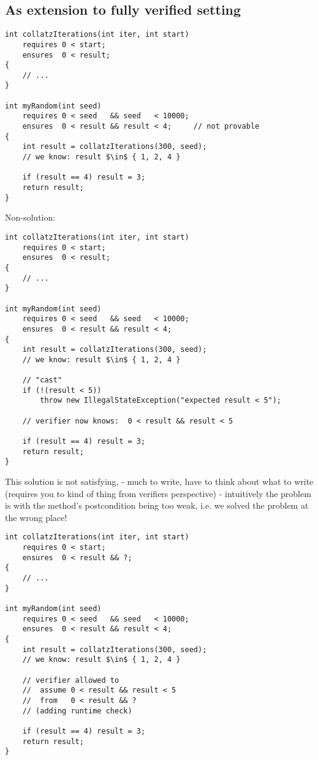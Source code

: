 \subsection{As extension to fully verified setting}
\begin{lstlisting}
int collatzIterations(int iter, int start)
    requires 0 < start;
    ensures  0 < result;
{
    // ...
}

int myRandom(int seed)
    requires 0 < seed   && seed   < 10000;
    ensures  0 < result && result < 4;     // not provable
{
    int result = collatzIterations(300, seed);
    // we know: result $\in$ { 1, 2, 4 }
    
    if (result == 4) result = 3;
    return result;
}
\end{lstlisting}

Non-solution:
\begin{lstlisting}
int collatzIterations(int iter, int start)
    requires 0 < start;
    ensures  0 < result;
{
    // ...
}

int myRandom(int seed)
    requires 0 < seed   && seed   < 10000;
    ensures  0 < result && result < 4;
{
    int result = collatzIterations(300, seed);
    // we know: result $\in$ { 1, 2, 4 }
    
    // "cast"
    if (!(result < 5))
        throw new IllegalStateException("expected result < 5");

    // verifier now knows:  0 < result && result < 5 
    
    if (result == 4) result = 3;
    return result;
}
\end{lstlisting}
This solution is not satisfying, 
- much to write, have to think about what to write (requires you to kind of thing from verifiers perspective)
- intuitively the problem is with the method's postcondition being too weak, i.e. we solved the problem at the wrong place!


\begin{lstlisting}
int collatzIterations(int iter, int start)
    requires 0 < start;
    ensures  0 < result && ?;
{
    // ...
}

int myRandom(int seed)
    requires 0 < seed   && seed   < 10000;
    ensures  0 < result && result < 4;
{
    int result = collatzIterations(300, seed);
    // we know: result $\in$ { 1, 2, 4 }
    
    // verifier allowed to
    //  assume 0 < result && result < 5
    //  from   0 < result && ?
    // (adding runtime check)
    
    if (result == 4) result = 3;
    return result;
}
\end{lstlisting}

